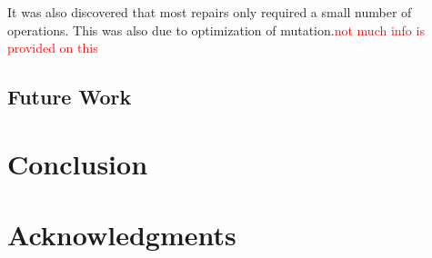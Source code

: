 \documentclass{sig-alternate}
\newcommand{\mycomment}[1]{\textcolor{red}{#1}}
\begin{document}
It was also discovered that most repairs only required a small number of operations. This was also due to optimization of mutation.\mycomment{not much info is provided on this}


\subsection{Future Work}



\section{Conclusion}


\section{Acknowledgments}


%

%
%
\end{document}
